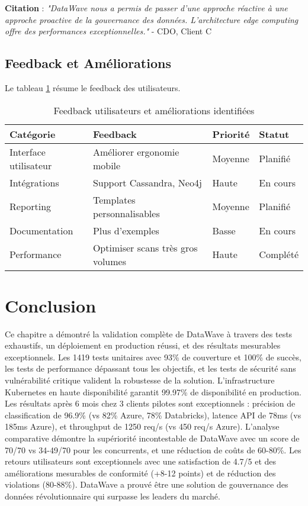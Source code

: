\textbf{Citation} : \textit{"DataWave nous a permis de passer d'une approche réactive à une approche proactive de la gouvernance des données. L'architecture edge computing offre des performances exceptionnelles."} - CDO, Client C

\subsection{Feedback et Améliorations}

Le tableau \ref{tab:feedback_utilisateurs} résume le feedback des utilisateurs.

\begin{table}[htpb]
\centering
\caption{Feedback utilisateurs et améliorations identifiées}
\label{tab:feedback_utilisateurs}
\begin{tabular}{|p{}|p{}|p{}|p{}|}
\hline
\textbf{Catégorie} & \textbf{Feedback} & \textbf{Priorité} & \textbf{Statut} \\
\hline
Interface utilisateur & Améliorer ergonomie mobile & Moyenne & Planifié \\
\hline
Intégrations & Support Cassandra, Neo4j & Haute & En cours \\
\hline
Reporting & Templates personnalisables & Moyenne & Planifié \\
\hline
Documentation & Plus d'exemples & Basse & En cours \\
\hline
Performance & Optimiser scans très gros volumes & Haute & Complété \\
\hline
\end{tabular}
\end{table}

\section*{Conclusion}

Ce chapitre a démontré la validation complète de DataWave à travers des tests exhaustifs, un déploiement en production réussi, et des résultats mesurables exceptionnels. Les 1419 tests unitaires avec 93\% de couverture et 100\% de succès, les tests de performance dépassant tous les objectifs, et les tests de sécurité sans vulnérabilité critique valident la robustesse de la solution. L'infrastructure Kubernetes en haute disponibilité garantit 99.97\% de disponibilité en production. Les résultats après 6 mois chez 3 clients pilotes sont exceptionnels : précision de classification de 96.9\% (vs 82\% Azure, 78\% Databricks), latence API de 78ms (vs 185ms Azure), et throughput de 1250 req/s (vs 450 req/s Azure). L'analyse comparative démontre la supériorité incontestable de DataWave avec un score de 70/70 vs 34-49/70 pour les concurrents, et une réduction de coûts de 60-80\%. Les retours utilisateurs sont exceptionnels avec une satisfaction de 4.7/5 et des améliorations mesurables de conformité (+8-12 points) et de réduction des violations (80-88\%). DataWave a prouvé être une solution de gouvernance des données révolutionnaire qui surpasse les leaders du marché.
